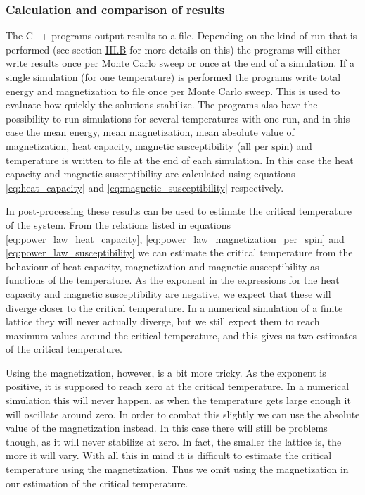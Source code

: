 \documentclass[reprint,english,notitlepage]{revtex4-1}  %
\begin{document}
\subsubsection{Calculation and comparison of results} \label{sec:III:a:iv}

The C++ programs output results to a file. Depending on the kind of run that is performed (see section \hyperref[sec:III:b]{III.B} for more details on this) the programs will either write results once per Monte Carlo sweep or once at the end of a simulation. If a single simulation (for one temperature) is performed the programs write total energy and magnetization to file once per Monte Carlo sweep. This is used to evaluate how quickly the solutions stabilize. The programs also have the possibility to run simulations for several temperatures with one run, and in this case the mean energy, mean magnetization, mean absolute value of magnetization, heat capacity, magnetic susceptibility (all per spin) and temperature is written to file at the end of each simulation. In this case the heat capacity and magnetic susceptibility are calculated using equations \eqref{eq:heat_capacity} and \eqref{eq:magnetic_susceptibility} respectively.

In post-processing these results can be used to estimate the critical temperature of the system. From the relations listed in equations \eqref{eq:power_law_heat_capacity}, \eqref{eq:power_law_magnetization_per_spin} and \eqref{eq:power_law_susceptibility} we can estimate the critical temperature from the behaviour of heat capacity, magnetization and magnetic susceptibility as functions of the temperature. As the exponent in the expressions for the heat capacity and magnetic susceptibility are negative, we expect that these will diverge closer to the critical temperature. In a numerical simulation of a finite lattice they will never actually diverge, but we still expect them to reach maximum values around the critical temperature, and this gives us two estimates of the critical temperature. 

Using the magnetization, however, is a bit more tricky. As the exponent is positive, it is supposed to reach zero at the critical temperature. In a numerical simulation this will never happen, as when the temperature gets large enough it will oscillate around zero. In order to combat this slightly we can use the absolute value of the magnetization instead. In this case there will still be problems though, as it will never stabilize at zero. In fact, the smaller the lattice is, the more it will vary. With all this in mind it is difficult to estimate the critical temperature using the magnetization. Thus we omit using the magnetization in our estimation of the critical temperature.
\end{document}
